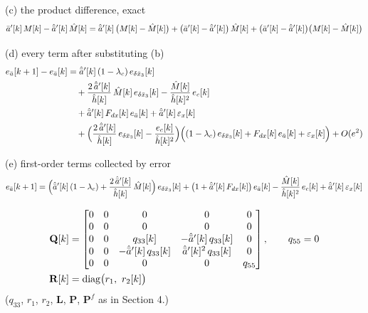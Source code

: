 \noindent (c) the product difference, exact
\[
\bar{a}'[k]\,M[k] - \hat{\bar{a}}'[k]\,\hat{M}[k]
= \hat{\bar{a}}'[k]\,\big(M[k] - \hat{M}[k]\big) + \big(\bar{a}'[k] - \hat{\bar{a}}'[k]\big)\,\hat{M}[k] + \big(\bar{a}'[k] - \hat{\bar{a}}'[k]\big)\big(M[k] - \hat{M}[k]\big)
\]

\noindent (d) every term after substituting (b)
\[
\begin{aligned}
e_{\bar{a}}[k+1] - e_{\bar{a}}[k]
&= \hat{\bar{a}}'[k]\,(1-\lambda_c)\,e_{\delta\bar{x}_3}[k] \\
&\quad + \frac{2\,\hat{\bar{a}}'[k]}{\hat{h}[k]}\,\hat{M}[k]\,e_{\delta\bar{x}_3}[k] - \frac{\hat{M}[k]}{\hat{h}[k]^{2}}\,e_c[k] \\
&\quad + \hat{\bar{a}}'[k]\,F_{dx}[k]\,e_{\bar{a}}[k] + \hat{\bar{a}}'[k]\,\varepsilon_x[k] \\
&\quad + \Big(\frac{2\,\hat{\bar{a}}'[k]}{\hat{h}[k]}\,e_{\delta\bar{x}_3}[k] - \frac{e_c[k]}{\hat{h}[k]^{2}}\Big)\Big((1-\lambda_c)\,e_{\delta\bar{x}_3}[k] + F_{dx}[k]\,e_{\bar{a}}[k] + \varepsilon_x[k]\Big) + O(e^{2})
\end{aligned}
\]

\noindent (e) first-order terms collected by error
\[
e_{\bar{a}}[k+1] = \Big(\hat{\bar{a}}'[k]\,(1-\lambda_c) + \frac{2\,\hat{\bar{a}}'[k]}{\hat{h}[k]}\,\hat{M}[k]\Big)\,e_{\delta\bar{x}_3}[k]
+ \big(1 + \hat{\bar{a}}'[k]\,F_{dx}[k]\big)\,e_{\bar{a}}[k]
- \frac{\hat{M}[k]}{\hat{h}[k]^{2}}\,e_c[k]
+ \hat{\bar{a}}'[k]\,\varepsilon_x[k]
\]

\[
\begin{aligned}
\mathbf{Q}[k] &=
\begin{bmatrix}
0 & 0 & 0 & 0 & 0 \\
0 & 0 & 0 & 0 & 0 \\
0 & 0 & q_{33}[k] & -\hat{\bar{a}}'[k]\,q_{33}[k] & 0 \\
0 & 0 & -\hat{\bar{a}}'[k]\,q_{33}[k] & \hat{\bar{a}}'[k]^{2}\,q_{33}[k] & 0 \\
0 & 0 & 0 & 0 & q_{55}
\end{bmatrix},
\qquad q_{55} = 0 \\
\mathbf{R}[k] &= \mathrm{diag}\big(r_1,\ r_2[k]\big)
\end{aligned}
\]
($q_{33}$, $r_1$, $r_2$, $\mathbf{L}$, $\mathbf{P}$, $\mathbf{P}^f$ as in Section 4.)

